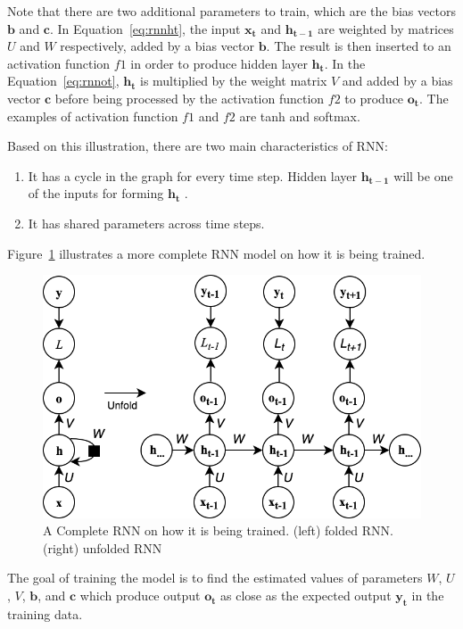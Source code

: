 Note that there are two additional parameters to train, which are the bias vectors $\mathbf{b}$ and $\mathbf{c}$. In Equation~\ref{eq:rnnht}, the input $\mathbf{x_{t}}$ and $\mathbf{h_{t-1}}$ are weighted by matrices $U$ and $W$ respectively, added by a bias vector $\mathbf{b}$. The result is then inserted to an activation function $f1$ in order to produce hidden layer $\mathbf{h_{t}}$. In the Equation~\ref{eq:rnnot}, $\mathbf{h_{t}}$ is multiplied by the weight matrix $V$ and added by a bias vector $\mathbf{c}$ before being processed by the activation function $f2$ to produce $\mathbf{o_{t}}$. The examples of activation function $f1$ and $f2$ are tanh and softmax.

Based on this illustration, there are two main characteristics of RNN:
\begin{enumerate}
	\item It has a cycle in the graph for every time step. Hidden layer $\mathbf{h_{t-1}}$  will be one of the inputs for forming $\mathbf{h_{t}}$ .
	\item It has shared parameters across time steps.
\end{enumerate}

Figure~\ref{fig:fulrnn} illustrates a more complete RNN model on how it is being trained.

\begin{figure}
	\centering
	\includegraphics[width=0.80\linewidth]{images/RNNUnfoldNew}
	\caption{A Complete RNN on how it is being trained. (left) folded RNN. (right) unfolded RNN}
	\label{fig:fulrnn}
\end{figure}

The goal of training the model is to find the estimated values of parameters $W$, $U$, $V$, $\mathbf{b}$, and $\mathbf{c}$ which produce output $\mathbf{o_{t}}$ as close as the expected output $\mathbf{y_{t}}$ in the training data. 

